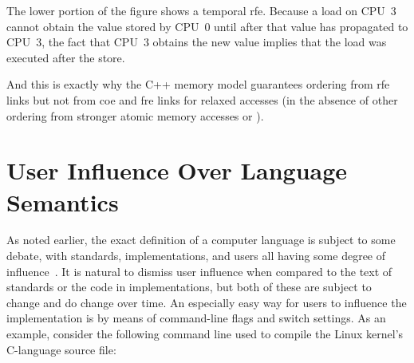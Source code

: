 \documentclass[10]{article}
\begin{document}
The lower portion of the figure shows a temporal rfe.
Because a load on CPU~3 cannot obtain the value stored by CPU~0 until
after that value has propagated to CPU~3, the fact that CPU~3 obtains
the new value implies that the load was executed after the store.

And this is exactly why the C++ memory model guarantees ordering from
rfe links but not from coe and fre links for relaxed accesses (in the
absence of other ordering from stronger atomic memory accesses or
).

\clearpage

\section{User Influence Over Language Semantics}
\label{app:User Influence Over Language Semantics}

As noted earlier, the exact definition of a computer language is subject
to some debate, with standards, implementations, and users all having
some degree of
influence~\cite{KayvanMemarian2016DepthOfC-1,KayvanMemarian2016DepthOfC-2}.
It is natural to dismiss user influence when compared to the text of
standards or the code in implementations, but both of these are subject to
change and do change over time.
An especially easy way for users to influence the implementation is by
means of command-line flags and switch settings.
As an example,
consider the following command line used to compile the Linux kernel's
 C-language source file:
\end{document}
